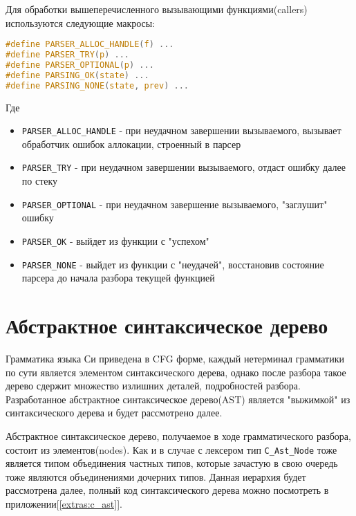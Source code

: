 Для обработки вышеперечисленного вызывающими функциями(callers) используются следующие макросы: 
\begin{lstlisting}[language=c, caption={Вспомогательные макросы обработки состояния разбора}]
#define PARSER_ALLOC_HANDLE(f) ...
#define PARSER_TRY(p) ... 
#define PARSER_OPTIONAL(p) ...
#define PARSING_OK(state) ...
#define PARSING_NONE(state, prev) ...
\end{lstlisting}

Где
\begin{itemize}
    \item \verb|PARSER_ALLOC_HANDLE| - при неудачном завершении вызываемого, вызывает обработчик ошибок аллокации, строенный в парсер
    \item \verb|PARSER_TRY| - при неудачном завершении вызываемого, отдаст ошибку далее по стеку
    \item\label{parsing:parser-optional-expl} \verb|PARSER_OPTIONAL| - при неудачном завершение вызываемого, "заглушит" ошибку
    \item \verb|PARSER_OK| - выйдет из функции с "успехом" 
    \item \verb|PARSER_NONE| - выйдет из функции с "неудачей", восстановив состояние парсера до начала разбора текущей функцией
\end{itemize}





\section{Абстрактное синтаксическое дерево}
\label{parsing:ast}

Грамматика языка Си приведена в CFG форме, каждый нетерминал грамматики по сути является элементом синтаксического дерева, 
однако после разбора такое дерево сдержит множество излишних деталей, подробностей разбора.
Разработанное абстрактное синтаксическое дерево(AST) является "выжимкой" из синтаксического дерева и будет рассмотрено далее.

Абстрактное синтаксическое дерево, получаемое в ходе грамматического разбора, состоит из элементов(nodes).
Как и в случае с лексером тип \verb|C_Ast_Node| тоже является типом объединения частных типов, которые зачастую в свою очередь тоже являются объединениями дочерних типов.
Данная иерархия будет рассмотрена далее, полный код синтаксического дерева можно посмотреть в приложении[\ref{extras:c_ast}].

